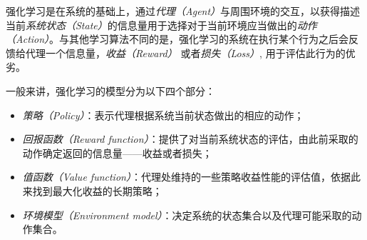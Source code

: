 ﻿\documentclass[11pt,draftclsnofoot,onecolumn,journal,letterpaper]{IEEEtran}
\begin{document}
%
%
%


强化学习是在系统的基础上，通过\emph{代理（Agent）}与周围环境的交互，以获得描述当前\emph{系统状态（State）}的信息量用于选择对于当前环境应当做出的\emph{动作（Action）}。与其他学习算法不同的是，强化学习的系统在执行某个行为之后会反馈给代理一个信息量，\emph{收益（Reward）} 或者\emph{损失（Loss）}, 用于评估此行为的优劣\cite{Sutton1998}。

一般来讲，强化学习的模型分为以下四个部分：
\begin{itemize}
\item \emph{策略（Policy）}：表示代理根据系统当前状态做出的相应的动作；
\item \emph{回报函数（Reward function）}：提供了对当前系统状态的评估，由此前采取的动作确定返回的信息量——收益或者损失；
\item \emph{值函数（Value function）}：代理处维持的一些策略收益性能的评估值，依据此来找到最大化收益的长期策略；
\item \emph{环境模型（Environment model）}：决定系统的状态集合以及代理可能采取的动作集合。
\end{itemize}
\end{document}
